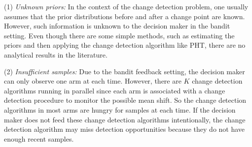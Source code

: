 \documentclass[letterpaper]{article} %
\newcommand{\blue}{}
\begin{document}
(1) \emph{Unknown priors:} In the context of the change detection
problem, one usually assumes that the prior distributions before and
after a change point are known. However, such information is unknown
to the decision maker in the bandit setting. Even though there are
some simple methods, such as estimating the priors and then applying
the change detection algorithm {\blue like PHT}, there are no analytical results in the
literature.

(2) \emph{Insufficient samples:} Due to the bandit feedback setting,
the decision maker can only observe one arm at each time. However,
there are $K$ change detection algorithms running in parallel since
each arm is associated with a change detection procedure to monitor
the possible mean shift. So the change detection algorithms in most
arms are hungry for samples at each time. If the decision maker does
not feed these change detection algorithms intentionally, the change
detection algorithm may miss detection opportunities because they do
not have enough recent samples.

\end{document}
